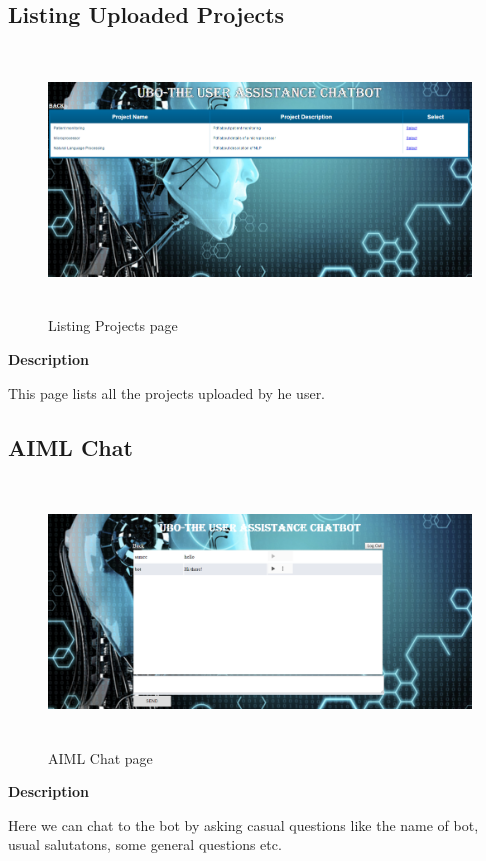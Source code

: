 \documentclass[12pt,a4paper,oneside]{report}
\begin{document}
\newpage
\subsection{Listing Uploaded Projects}
\begin{figure}[h]
	\begin{center}
		\includegraphics[width=13cm,height=7cm]{list_of_projects.png}
			\caption{Listing Projects page}
			\label{Listing Projects page}
	\end{center}
\end{figure}
\textbf{Description}
\par This page lists all the projects uploaded by he user.

\newpage
\subsection{AIML Chat}
\begin{figure}[h]
	\begin{center}
		\includegraphics[width=13cm,height=7cm]{aiml_chat.png}
			\caption{AIML Chat page}
			\label{AIML Chat page}
	\end{center}
\end{figure}
\textbf{Description}
\par Here we can chat to the bot by asking casual questions like the name of bot, usual salutatons, some general questions etc.
\end{document}
